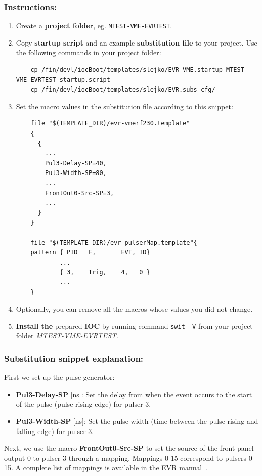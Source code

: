 \documentclass[12pt,a4paper]{article}
\begin{document}
\subsubsection{Instructions:}
\begin{enumerate}
	\item Create a \textbf{project folder}, eg. \texttt{MTEST-VME-EVRTEST}.
	\item Copy \textbf{startup script} and an example \textbf{substitution file} to your project. Use the following commands in your project folder:
\begin{lstlisting}
	cp /fin/devl/iocBoot/templates/slejko/EVR_VME.startup MTEST-VME-EVRTEST_startup.script
	cp /fin/devl/iocBoot/templates/slejko/EVR.subs cfg/
\end{lstlisting}

	\item Set the macro values in the substitution file according to this snippet:
\begin{lstlisting}
	file "$(TEMPLATE_DIR)/evr-vmerf230.template"
	{
	  {
		...
		Pul3-Delay-SP=40,
		Pul3-Width-SP=80,
		...
		FrontOut0-Src-SP=3,
		...
	  }
	}

	file "$(TEMPLATE_DIR)/evr-pulserMap.template"{
	pattern { PID   F,       EVT, ID}
			...
    	    { 3,    Trig,    4,   0 }
			...
	}
\end{lstlisting}

	\item Optionally, you can remove all the macros whose values you did not change. 
	\item \textbf{Install the} prepared \textbf{IOC} by running command \texttt{swit -V} from your project folder \textit{MTEST-VME-EVRTEST}.
\end{enumerate}
\subsubsection{Substitution snippet explanation:}

First we set up the pulse generator:
\begin{itemize}
	\item \textbf{Pul3-Delay-SP} [ns]: Set the delay from when the event occurs to the start of the pulse (pulse rising edge) for pulser 3. 
	\item \textbf{Pul3-Width-SP} [ns]: Set the pulse width (time between the pulse rising and falling edge) for pulser 3.
\end{itemize}

Next, we use the macro  \textbf{FrontOut0-Src-SP} to set the source of the front panel output 0  to pulser 3 through a mapping. Mappings 0-15 correspond to pulsers 0-15. A complete list of mappings is available in the EVR manual~\cite{evr_manual}.
\end{document}
